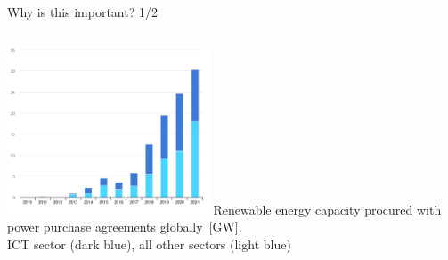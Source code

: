 \begin{frame}{Why is this important? 1/2}
{\begin{columns}[T]
      \begin{column}{6cm}
      \centering
      \vspace{.3cm}
      \includegraphics[width=6cm]{images/iea-PPAbysector-2010-2021.png}
      {\scriptsize
      Renewable energy capacity procured with power purchase agreements globally~[GW]. \\
      ICT sector (dark blue), all other sectors (light blue)}
    \end{column}
  
    \end{columns}

  }
\end{frame}


